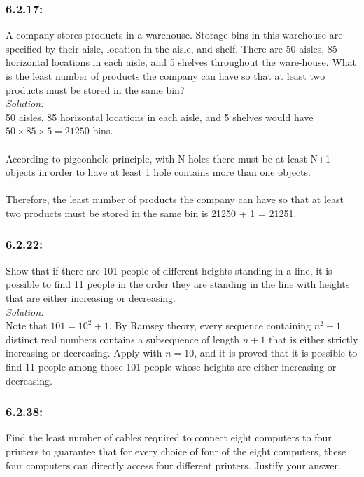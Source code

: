 \documentclass[a4paper]{article}
\begin{document}
\subsubsection*{6.2.17:}
A company stores products in a warehouse. Storage bins in this warehouse are specified by their aisle, location in the aisle, and shelf. There are 50 aisles, 85 horizontal locations in each aisle, and 5 shelves throughout the ware-house. What is the least number of products the company can have so that at least two products must be stored in the same bin?\\
\textit{Solution:}\\
50 aisles, 85 horizontal locations in each aisle, and 5 shelves would have $50\times85\times5 = 21250$ bins.\\\\
According to pigeonhole principle, with N holes there must be at least N+1 objects in order to have at least 1 hole contains more than one objects.\\\\
Therefore, the least number of products the company can have so that at least two products must be stored in the same bin is 21250 + 1 = 21251.
\subsubsection*{6.2.22:}
Show that if there are 101 people of different heights standing in a line, it is possible to find 11 people in the order they are standing in the line with heights that are either increasing or decreasing.\\

\textit{Solution: }\\ 
Note that $101 = 10^2 + 1$. By Ramsey theory, every sequence containing $n^2 + 1$ distinct real numbers contains a subsequence of length $n+1$ that is either strictly increasing or decreasing. Apply with $n=10$, and it is proved that it is possible to find 11 people among those 101 people whose heights are either increasing or decreasing.

\subsubsection*{6.2.38:}
Find the least number of cables required to connect eight computers to four printers to guarantee that for every choice of four of the eight computers, these four computers can directly access four different printers. Justify your answer.\\
\end{document}
